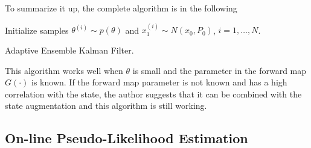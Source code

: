 To summarize it up, the complete algorithm is in the following 
\begin{algorithm}[h]
\SetAlgoLined 
Initialize samples $\theta^{(i)}\sim p(\theta)$ and $x_1^{(i)}\sim N(x_0,P_0)$, $i=1,\ldots,N$. \\
\caption{Adaptive Ensemble Kalman Filter.}\label{algorithmEnKF}
\end{algorithm}

This algorithm works well when $\theta$ is small and the parameter in the forward map $G(\cdot)$ is known. If the forward map parameter is not known and has a high correlation with the state, the author suggests that it can be combined with the state augmentation \cite{anderson2001ensemble} and this algorithm is still working. 



\subsection{On-line Pseudo-Likelihood Estimation}

